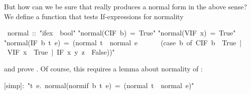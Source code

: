 \begin{isabelle}
\begin{isamarkuptext}
But how can we be sure that  really produces a normal form in
the above sense? We define a function that tests If-expressions for normality%
\end{isamarkuptext}%
\ normal\ ::\ {"}ifex\ {\isasymRightarrow}\ bool{"}\isanewline
{}\isanewline
{"}normal(CIF\ b)\ =\ True{"}\isanewline
{"}normal(VIF\ x)\ =\ True{"}\isanewline
{"}normal(IF\ b\ t\ e)\ =\ (normal\ t\ {\isasymand}\ normal\ e\ {\isasymand}\isanewline
\ \ \ \ \ (case\ b\ of\ CIF\ b\ {\isasymRightarrow}\ True\ |\ VIF\ x\ {\isasymRightarrow}\ True\ |\ IF\ x\ y\ z\ {\isasymRightarrow}\ False)){"}%
\begin{isamarkuptext}%
\noindent
and prove . Of course, this requires a lemma about
normality of :%
\end{isamarkuptext}%
[simp]:\ {"}{\isasymforall}t\ e.\ normal(normif\ b\ t\ e)\ =\ (normal\ t\ {\isasymand}\ normal\ e){"}\end{isabelle}%
